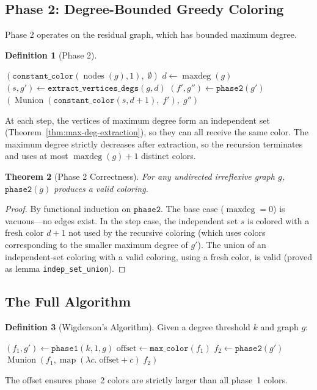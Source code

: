 \documentclass[11pt]{article}
\theoremstyle{plain}
\newtheorem{theorem}{Theorem}[section]
\theoremstyle{definition}
\newtheorem{definition}[theorem]{Definition}
\theoremstyle{remark}
\newcommand{\nodes}{\operatorname{nodes}}
\newcommand{\Munion}{\operatorname{Munion}}
\newcommand{\maxdeg}{\operatorname{maxdeg}}
\begin{document}
\subsection{Phase 2: Degree-Bounded Greedy Coloring}

Phase 2 operates on the residual graph, which has bounded maximum degree.

\begin{definition}[Phase 2]
\begin{algorithmic}[1]
  \If{$\maxdeg(g) = 0$}
    \State \Return $(\texttt{constant\_color}(\nodes(g), 1),\; \emptyset)$
  \Else
    \State $d \gets \maxdeg(g)$
    \State $(s, g') \gets \texttt{extract\_vertices\_degs}(g, d)$ 
    \State $(f', g'') \gets \texttt{phase2}(g')$
    \State \Return $(\Munion(\texttt{constant\_color}(s, d{+}1),\; f'),\; g'')$
  \EndIf
\EndFunction
\end{algorithmic}
\end{definition}

At each step, the vertices of maximum degree form an independent set (Theorem~\ref{thm:max-deg-extraction}), so they can all receive the same color. The maximum degree strictly decreases after extraction, so the recursion terminates and uses at most $\maxdeg(g) + 1$ distinct colors.

\begin{theorem}[Phase 2 Correctness]
\label{thm:phase2-ok}
For any undirected irreflexive graph $g$, $\texttt{phase2}(g)$ produces a valid coloring.
\end{theorem}

\begin{proof}
By functional induction on $\texttt{phase2}$. The base case ($\maxdeg = 0$) is vacuous---no edges exist. In the step case, the independent set $s$ is colored with a fresh color $d{+}1$ not used by the recursive coloring (which uses colors corresponding to the smaller maximum degree of $g'$). The union of an independent-set coloring with a valid coloring, using a fresh color, is valid (proved as lemma \texttt{indep\_set\_union}).
\end{proof}

\subsection{The Full Algorithm}

\begin{definition}[Wigderson's Algorithm]
\label{def:wigderson}
Given a degree threshold $k$ and graph $g$:
\begin{algorithmic}[1]
  \State $(f_1, g') \gets \texttt{phase1}(k, 1, g)$
  \State $\text{offset} \gets \texttt{max\_color}(f_1)$
  \State $f_2 \gets \texttt{phase2}(g')$
  \State \Return $\Munion(f_1, \;\text{map}\;(\lambda c.\; \text{offset} + c)\; f_2)$
\EndFunction
\end{algorithmic}
The offset ensures phase~2 colors are strictly larger than all phase~1 colors.
\end{definition}
\end{document}
